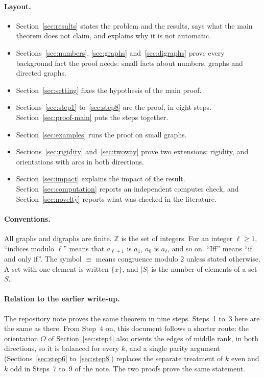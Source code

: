 \documentclass[11pt]{article}
\theoremstyle{plain}
\theoremstyle{definition}
\theoremstyle{remark}
\begin{document}
\paragraph{Layout.}
\begin{itemize}[itemsep=0.2em]
  \item Section~\ref{sec:results} states the problem and the results, says what the main
    theorem does not claim, and explains why it is not automatic.
  \item Sections~\ref{sec:numbers}, \ref{sec:graphs} and~\ref{sec:digraphs} prove every
    background fact the proof needs: small facts about numbers, graphs and directed graphs.
  \item Section~\ref{sec:setting} fixes the hypothesis of the main proof.
  \item Sections~\ref{sec:step1} to~\ref{sec:step8} are the proof, in eight steps.
    Section~\ref{sec:proof-main} puts the steps together.
  \item Section~\ref{sec:examples} runs the proof on small graphs.
  \item Sections~\ref{sec:rigidity} and~\ref{sec:twoway} prove two extensions: rigidity, and
    orientations with arcs in both directions.
  \item Section~\ref{sec:impact} explains the impact of the result.
    Section~\ref{sec:computation} reports an independent computer check, and
    Section~\ref{sec:novelty} reports what was checked in the literature.
\end{itemize}

\paragraph{Conventions.} All graphs and digraphs are finite. $\mathbb{Z}$ is the set of
integers. For an integer $\ell\ge 1$, ``indices modulo $\ell$'' means that $a_{\ell+1}$ is
$a_1$, $a_0$ is $a_\ell$, and so on. ``Iff'' means ``if and only if''. The symbol $\equiv$
means congruence modulo $2$ unless stated otherwise. A set with one element is written
$\{x\}$, and $|S|$ is the number of elements of a set $S$.

\paragraph{Relation to the earlier write-up.} The repository note
 proves the same theorem in nine steps.
Steps~1 to~3 here are the same as there. From Step~4 on, this document follows a shorter route:
the orientation $O$ of Section~\ref{sec:step4} also orients the edges of middle rank, in both
directions, so it is balanced for every $k$, and a single parity argument
(Sections~\ref{sec:step6} to~\ref{sec:step8}) replaces the separate treatment of $k$ even and
$k$ odd in Steps~7 to~9 of the note. The two proofs prove the same statement.
\end{document}

